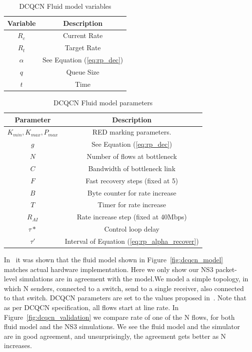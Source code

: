 \begin{table}[t]
\center
{
\footnotesize
{
\begin{tabular}{|c|c|} \hline
Variable & Description \\ \hline
$R_c$ & Current Rate \\ \hline
$R_t$ & Target Rate \\ \hline
$\alpha$ & See Equation (\ref{eq:rp_dec}) \\ \hline
$q$ & Queue Size \\ \hline
$t$ & Time \\ \hline
\end{tabular}
}
}
\caption{DCQCN Fluid model variables}
\label{tab:dcqcn_var}
\end{table}
\begin{table}[t]
\center
{
\footnotesize
{
\begin{tabular}{|c|c|} \hline
Parameter & Description \\ \hline
$K_{min}, K_{max}, P_{max}$ & RED marking parameters. \\ \hline
$g$ & See Equation (\ref{eq:rp_dec}) \\ \hline
$N$ & Number of flows at bottleneck\\ \hline
$C$ & Bandwidth of bottleneck link\\ \hline
$F$ & Fast recovery steps (fixed at 5) \\ \hline
$B$ & Byte counter for rate increase\\ \hline
$T$ & Timer for rate increase\\ \hline
$R_{AI}$ & Rate increase step (fixed at 40Mbps)\\ \hline
$\tau *$ & Control loop delay \\ \hline
$\tau '$ & Interval of Equation (\ref{eq:rp_alpha_recover})\\ \hline
\end{tabular}
}
}
\caption{DCQCN Fluid model parameters}
\label{tab:dcqcn_param}
\end{table}

In~\cite{dcqcn} it was shown that the fluid model shown in
Figure~\ref{fig:dcqcn_model} matches actual hardware implementation. Here we
only show our NS3 packet-level simulations are in agreement with the model.We
model a simple topology, in which N senders, connected to a switch, send to a
single receiver, also connected to that switch. DCQCN parameters are set to the
values proposed in~\cite{dcqcn}. Note that as per DCQCN specification, all flows
start at line rate. In Figure~\ref{fig:dcqcn_validation} we compare rate of one
of the N flows, for both fluid model and the NS3 simulations. We see the fluid
model and the simulator are in good agreement, and unsurprisingly, the agreement
gets better as N increases.

